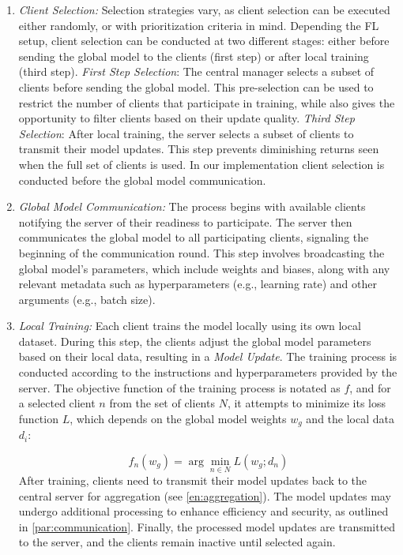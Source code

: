 \begin{enumerate}

    \item \emph{Client Selection:} Selection strategies vary, as client selection can be executed either randomly, or with prioritization criteria in mind.
          Depending the FL setup, client selection can be conducted at two different stages: either before sending the global model
          to the clients (first step) or after local training (third step).
          \emph{First Step Selection}: The central manager selects a subset of clients before sending the global model. This pre-selection
          can be used to restrict the number of clients that participate in training, while also gives the opportunity to filter clients based
          on their update quality.
          \emph{Third Step Selection}: After local training, the server selects a subset of clients to transmit their model updates. This step
          prevents diminishing returns seen when the full set of clients is used.  In our implementation client selection is conducted before the
          global model communication.

    \item \emph{Global Model Communication:} The process begins with available clients notifying the server of their readiness to participate. The server then
          communicates the global model to all participating clients, signaling the beginning of the communication round. This step involves broadcasting the global
          model's parameters, which include weights and biases, along with any relevant metadata such as hyperparameters (e.g., learning rate) and other arguments
          (e.g., batch size).

    \item \emph{Local Training:} Each client trains the model locally using its own local dataset. During this step, the clients adjust the global model
          parameters based on their local data, resulting in a \emph{Model Update}. The training process is conducted according to the instructions and
          hyperparameters provided by the server. The objective function of the training process is notated as \( f \), and for a selected client \( n \)
          from the set of clients \( N \), it attempts to minimize its loss function \( L \), which depends on the global model weights \( w_g \) and the
          local data \( d_i \):

          \begin{equation}
              f_n(w_g) = \arg\min_{n \in N} L(w_g; d_n)
          \end{equation}
          After training, clients need to transmit their model updates back to the central server for aggregation (see \cref{en:aggregation}).
          The model updates may undergo additional processing to enhance efficiency and security, as outlined in \cref{par:communication}.
          Finally, the processed model updates are transmitted to the server, and the clients remain inactive until selected again.


\end{enumerate}

